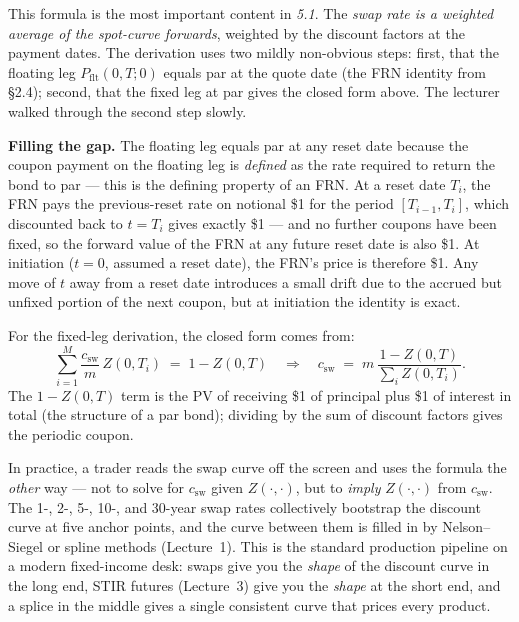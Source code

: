 This formula is the most important content in \emph{5.1}. The
\emph{swap rate is a weighted average of the spot-curve forwards},
weighted by the discount factors at the payment dates. The derivation
uses two mildly non-obvious steps: first, that the floating leg
$P_{\text{flt}}(0,T;0)$ equals par at the quote date (the FRN identity
from \S2.4); second, that the fixed leg at par gives the closed form
above. The lecturer walked through the second step slowly.

\begin{tipblock}
\textbf{Filling the gap.} The floating leg equals par at any reset date
because the coupon payment on the floating leg is \emph{defined} as the
rate required to return the bond to par --- this is the defining property
of an FRN. At a reset date $T_i$, the FRN pays the previous-reset rate on
notional \$1 for the period $[T_{i-1}, T_i]$, which discounted back to
$t = T_i$ gives exactly \$1 --- and no further coupons have been fixed, so
the forward value of the FRN at any future reset date is also \$1. At
initiation ($t=0$, assumed a reset date), the FRN's price is therefore
\$1. Any move of $t$ away from a reset date introduces a small drift due
to the accrued but unfixed portion of the next coupon, but at initiation
the identity is exact.

For the fixed-leg derivation, the closed form comes from:
\[
   \sum_{i=1}^M \frac{c_{\text{sw}}}{m}\,Z(0,T_i) \;=\; 1 - Z(0,T)
   \quad\Longrightarrow\quad
   c_{\text{sw}} \;=\; m\,\frac{1-Z(0,T)}{\sum_i Z(0,T_i)}.
\]
The $1-Z(0,T)$ term is the PV of receiving \$1 of principal plus \$1 of
interest in total (the structure of a par bond); dividing by the sum of
discount factors gives the periodic coupon.
\end{tipblock}

In practice, a trader reads the swap curve off the screen and uses the
formula the \emph{other} way --- not to solve for $c_{\text{sw}}$ given
$Z(\cdot,\cdot)$, but to \emph{imply} $Z(\cdot,\cdot)$ from
$c_{\text{sw}}$. The 1-, 2-, 5-, 10-, and 30-year swap rates collectively
bootstrap the discount curve at five anchor points, and the curve between
them is filled in by Nelson--Siegel or spline methods (Lecture~1). This
is the standard production pipeline on a modern fixed-income desk: swaps
give you the \emph{shape} of the discount curve in the long end, STIR
futures (Lecture~3) give you the \emph{shape} at the short end, and a
splice in the middle gives a single consistent curve that prices every
product.

